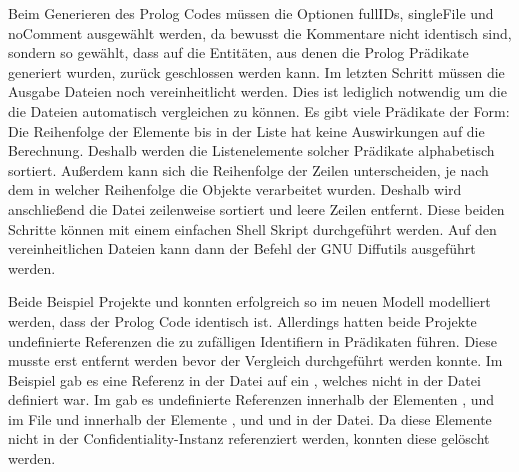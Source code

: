 \documentclass[twoside, ngerman]{sdqseminar}
\begin{document}
Beim Generieren des Prolog Codes müssen die Optionen fullIDs, singleFile und noComment ausgewählt werden, da bewusst die Kommentare nicht identisch sind, sondern so gewählt, dass auf die Entitäten, aus denen die Prolog Prädikate generiert wurden, zurück geschlossen werden kann. Im letzten Schritt müssen die Ausgabe Dateien noch vereinheitlicht werden. Dies ist lediglich notwendig um die die Dateien automatisch vergleichen zu können. Es gibt viele Prädikate der Form:  Die Reihenfolge der Elemente  bis  in der Liste hat keine Auswirkungen auf die Berechnung. Deshalb werden die Listenelemente solcher Prädikate alphabetisch sortiert. Außerdem kann sich die Reihenfolge der Zeilen unterscheiden, je nach dem in welcher Reihenfolge die Objekte verarbeitet wurden. Deshalb wird anschließend die Datei zeilenweise sortiert und leere Zeilen entfernt. Diese beiden Schritte können mit einem einfachen Shell Skript durchgeführt werden. Auf den vereinheitlichen Dateien kann dann der  Befehl der GNU Diffutils ausgeführt werden.

Beide Beispiel Projekte  und  konnten erfolgreich so im neuen Modell modelliert werden, dass der Prolog Code identisch ist. Allerdings hatten beide Projekte undefinierte Referenzen die zu zufälligen Identifiern in Prädikaten führen. Diese musste erst entfernt werden bevor der Vergleich durchgeführt werden konnte. Im  Beispiel gab es eine Referenz  in der  Datei auf ein , welches nicht in der  Datei definiert war. Im  gab es  undefinierte Referenzen innerhalb der Elementen ,  und  im File  und innerhalb der Elemente ,  und  und in der  Datei. Da diese Elemente nicht in der Confidentiality-Instanz referenziert werden, konnten diese gelöscht werden.
\end{document}
